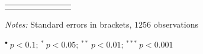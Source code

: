 \documentclass[a4paper,12pt]{article}
\begin{document}
{\begin{threeparttable}
\begin{footnotesize}
\begin{tabular}{lcrcrcr}
\hline
\vspace{-0.2cm}
\end{tabular} 
\end{footnotesize}
 \begin{tablenotes}
  \begin{footnotesize}
    \item \textit{Notes:} Standard errors in brackets, \hspace{0.05cm}$1256$ observations
        \begin{adjustwidth}{1cm}{} 
    \item \hspace{0.45cm}$^{\bullet}~p<0.1$; $^{*}~p<0.05$; $^{**}~p<0.01$; $^{***}~p<0.001$
     \end{adjustwidth}
\singlespacing
  \end{footnotesize}
\end{tablenotes}
  \end{threeparttable} 
\par}
\linespread{1}

\pagebreak








\makeatletter 
\renewcommand{\thesection}{\hspace*{-1.0em}}
\newpage
\linespread{1}

%


\newpage


\setcounter{table}{0} 
\makeatletter 
\renewcommand{\thetable}{A\@arabic \c@table} 
\FloatBarrier
\end{document}
